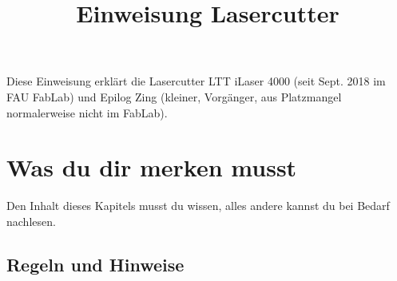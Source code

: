\documentclass{\basedir/fablab-document}
\title{Einweisung Lasercutter}
\begin{document}
	\maketitle
	
	Diese Einweisung erklärt die Lasercutter LTT iLaser 4000 (seit Sept. 2018 im FAU FabLab) und Epilog Zing (kleiner, Vorgänger, aus Platzmangel normalerweise nicht im FabLab).
	
	\section{Was du dir merken musst}
	Den Inhalt dieses Kapitels musst du wissen, alles andere kannst du bei Bedarf nachlesen.
	\subsection{Regeln und Hinweise}
\end{document}
